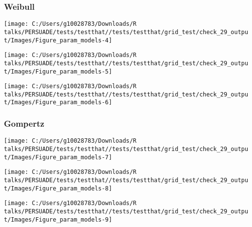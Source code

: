 \documentclass[
]{article}
\begin{document}
\clearpage

\subsubsection{Weibull}\label{weibull}

\begin{flushleft}\texttt{[image: C:/Users/g10028783/Downloads/R talks/PERSUADE/tests/testthat//tests/testthat/grid\_test/check\_29\_output/Images/Figure\_param\_models-4]} \end{flushleft}

\begin{flushleft}\texttt{[image: C:/Users/g10028783/Downloads/R talks/PERSUADE/tests/testthat//tests/testthat/grid\_test/check\_29\_output/Images/Figure\_param\_models-5]} \end{flushleft}

\begin{flushleft}\texttt{[image: C:/Users/g10028783/Downloads/R talks/PERSUADE/tests/testthat//tests/testthat/grid\_test/check\_29\_output/Images/Figure\_param\_models-6]} \end{flushleft}

\clearpage

\subsubsection{Gompertz}\label{gompertz}

\begin{flushleft}\texttt{[image: C:/Users/g10028783/Downloads/R talks/PERSUADE/tests/testthat//tests/testthat/grid\_test/check\_29\_output/Images/Figure\_param\_models-7]} \end{flushleft}

\begin{flushleft}\texttt{[image: C:/Users/g10028783/Downloads/R talks/PERSUADE/tests/testthat//tests/testthat/grid\_test/check\_29\_output/Images/Figure\_param\_models-8]} \end{flushleft}

\begin{flushleft}\texttt{[image: C:/Users/g10028783/Downloads/R talks/PERSUADE/tests/testthat//tests/testthat/grid\_test/check\_29\_output/Images/Figure\_param\_models-9]} \end{flushleft}

\clearpage
\end{document}
